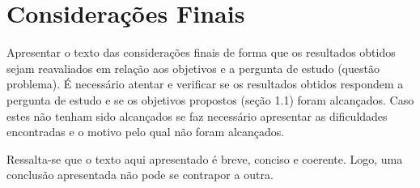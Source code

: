 \section{Considerações Finais}

Apresentar o texto das considerações finais de forma que os resultados obtidos
sejam reavaliados em relação aos objetivos e a pergunta de estudo (questão
problema). É necessário atentar e verificar se os resultados obtidos respondem
a pergunta de estudo e se os objetivos propostos (seção 1.1) foram alcançados.
Caso estes não tenham sido alcançados se faz necessário apresentar as
dificuldades encontradas e o motivo pelo qual não foram alcançados.

Ressalta-se que o texto aqui apresentado é breve, conciso e coerente. Logo, uma
conclusão apresentada não pode se contrapor a outra.
